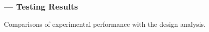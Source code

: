 \subsubsection*{ --- Testing Results}
Comparisons of experimental performance with the design analysis.
